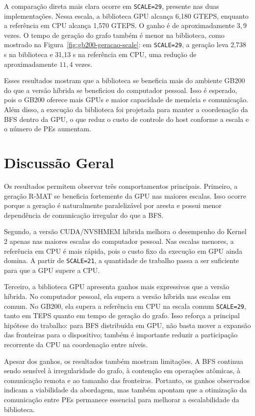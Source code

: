 A comparação direta mais clara ocorre em \texttt{SCALE=29}, presente nas duas
implementações. Nessa escala, a biblioteca GPU alcança 6,180 GTEPS, enquanto a
referência em CPU alcança 1,570 GTEPS. O ganho é de aproximadamente $3{,}9$
vezes. O tempo de geração do grafo também é menor na biblioteca, como mostrado na
Figura~\ref{fig:gb200-geracao-scale}: em \texttt{SCALE=29}, a geração leva 2,738
s na biblioteca e 31,13 s na referência em CPU, uma redução de aproximadamente
$11{,}4$ vezes.

Esses resultados mostram que a biblioteca se beneficia mais do ambiente GB200 do
que a versão híbrida se beneficiou do computador pessoal. Isso é esperado, pois o
GB200 oferece mais GPUs e maior capacidade de memória e comunicação. Além disso,
a execução da biblioteca foi projetada para manter a coordenação da BFS dentro da
GPU, o que reduz o custo de controle do host conforme a escala e o número de PEs
aumentam.

\section{Discussão Geral}

Os resultados permitem observar três comportamentos principais. Primeiro, a
geração R-MAT se beneficia fortemente da GPU nas maiores escalas. Isso ocorre
porque a geração é naturalmente paralelizável por aresta e possui menor
dependência de comunicação irregular do que a BFS.

Segundo, a versão CUDA/NVSHMEM híbrida melhora o desempenho do Kernel 2 apenas
nas maiores escalas do computador pessoal. Nas escalas menores, a referência em
CPU é mais rápida, pois o custo fixo da execução em GPU ainda domina. A partir de
\texttt{SCALE=21}, a quantidade de trabalho passa a ser suficiente para que a GPU
supere a CPU.

Terceiro, a biblioteca GPU apresenta ganhos mais expressivos que a versão híbrida.
No computador pessoal, ela supera a versão híbrida nas escalas em comum. No GB200,
ela supera a referência em CPU na escala comum \texttt{SCALE=29}, tanto em TEPS
quanto em tempo de geração do grafo. Isso reforça a principal hipótese do
trabalho: para BFS distribuída em GPU, não basta mover a expansão das fronteiras
para o dispositivo; também é importante reduzir a participação recorrente da CPU
na coordenação entre níveis.

Apesar dos ganhos, os resultados também mostram limitações. A BFS continua sendo
sensível à irregularidade do grafo, à contenção em operações atômicas, à
comunicação remota e ao tamanho das fronteiras. Portanto, os ganhos observados
indicam a viabilidade da abordagem, mas também apontam que a otimização da
comunicação entre PEs permanece essencial para melhorar a escalabilidade da
biblioteca.
